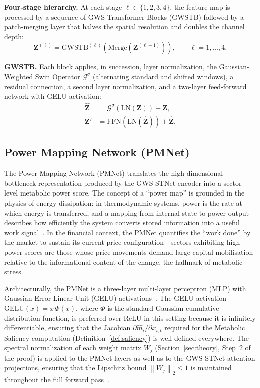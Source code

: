 \documentclass[11pt,a4paper]{article}  %
\newcommand{\Gop}{\mathcal{G}^{\sigma}}
\newcommand{\norm}[1]{\left\lVert#1\right\rVert}
\theoremstyle{plain}
\theoremstyle{definition}
\theoremstyle{remark}
\begin{document}
\textbf{Four-stage hierarchy.} At each stage $\ell\in\{1,2,3,4\}$,
the feature map is processed by a sequence of GWS Transformer Blocks
(GWSTB) followed by a patch-merging layer that halves the spatial
resolution and doubles the channel depth:
\[
   \mathbf{Z}^{(\ell)} = \mathrm{GWSTB}^{(\ell)}\!\left(
   \mathrm{Merge}\!\left(\mathbf{Z}^{(\ell-1)}\right)\right),
   \qquad \ell = 1,\ldots,4.
\]

\textbf{GWSTB.} Each block applies, in succession, layer normalization,
the Gaussian-Weighted Swin Operator $\Gop$ (alternating standard and
shifted windows), a residual connection, a second layer normalization,
and a two-layer feed-forward network with GELU activation:
\begin{align}
   \hat{\mathbf{Z}} &= \Gop\!\left(\mathrm{LN}(\mathbf{Z})\right)
                       + \mathbf{Z}, \\
   \mathbf{Z}'      &= \mathrm{FFN}\!\left(\mathrm{LN}(\hat{\mathbf{Z}})\right)
                       + \hat{\mathbf{Z}}.
\end{align}

\subsection{Power Mapping Network (PMNet)}
\label{subsec:pmnet}

The Power Mapping Network (PMNet) translates the high-dimensional
bottleneck representation produced by the GWS-STNet encoder into a
sector-level metabolic power score. The concept of a ``power map''
is grounded in the physics of energy dissipation: in thermodynamic
systems, power is the rate at which energy is transferred, and a
mapping from internal state to power output describes how efficiently
the system converts stored information into a useful work signal~\cite{Prigogine1977}.
In the financial context, the PMNet quantifies the ``work done'' by
the market to sustain its current price configuration---sectors
exhibiting high power scores are those whose price movements demand
large capital mobilisation relative to the informational content
of the change, the hallmark of metabolic stress.

Architecturally, the PMNet is a three-layer multi-layer perceptron
(MLP) with Gaussian Error Linear Unit (GELU) activations~\cite{Hendrycks2016}.
The GELU activation $\mathrm{GELU}(x) = x\,\Phi(x)$, where $\Phi$
is the standard Gaussian cumulative distribution function, is
preferred over ReLU in this setting because it is infinitely
differentiable, ensuring that the Jacobian $\partial\hat{m}_i/\partial x_{i,t}$
required for the Metabolic Saliency computation
(Definition~\ref{def:saliency}) is well-defined everywhere.
The spectral normalization of each weight matrix $W_j$
(Section~\ref{sec:theory}, Step~2 of the proof) is applied to the
PMNet layers as well as to the GWS-STNet attention projections,
ensuring that the Lipschitz bound $\norm{W_j}_2 \leq 1$ is
maintained throughout the full forward pass~\cite{Miyato2018}.
\end{document}
